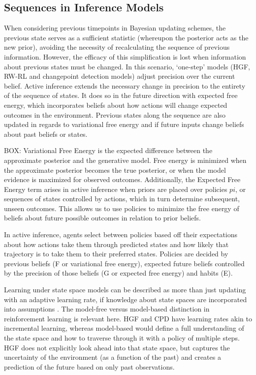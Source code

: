 \documentclass{article}
\begin{document}
\subsection{Sequences in Inference Models}

When considering previous timepoints in Bayesian updating schemes, the previous state serves as a sufficient statistic (whereupon the posterior acts as the new prior), avoiding the necessity of recalculating the sequence of previous information. However, the efficacy of this simplification is lost when information about previous states must be changed. In this scenario, ‘one-step’ models (HGF, RW-RL and changepoint detection models) adjust precision over the current belief. Active inference extends the necessary change in precision to the entirety of the sequence of states. It does so in the future direction with expected free energy, which incorporates beliefs about how actions will change expected outcomes in the environment. Previous states along the sequence are also updated in regards to variational free energy and if future inputs change beliefs about past beliefs or states.

BOX:
Variational Free Energy is the expected difference between the approximate posterior and the generative model. Free energy is minimized when the approximate posterior becomes the true posterior, or when the model evidence is maximized for observed outcomes.
Additionally, the Expected Free Energy term arises in active inference when priors are placed over policies $pi$, or sequences of states controlled by actions, which in turn determine subsequent, unseen outcomes. This allows us to use policies to minimize the free energy of beliefs about future possible outcomes in relation to prior beliefs.

In active inference, agents select between policies based off their expectations about how actions take them through predicted states and how likely that trajectory is to take them to their preferred states. Policies are decided by previous beliefs (F or variational free energy), expected future beliefs controlled by the precision of those beliefs (G or expected free energy) and habits (E).

Learning under state space models can be described as more than just updating with an adaptive learning rate, if knowledge about state spaces are incorporated into assumptions \citep{mcnamee2017efficient}. The model-free versus model-based distinction in reinforcement learning is relevant here. HGF and CPD have learning rates akin to incremental learning, whereas model-based would define a full understanding of the state space and how to traverse through it with a policy of multiple steps. HGF does not explicitly look ahead into that state space, but captures the uncertainty of the environment (as a function of the past) and creates a prediction of the future based on only past observations.
\end{document}
